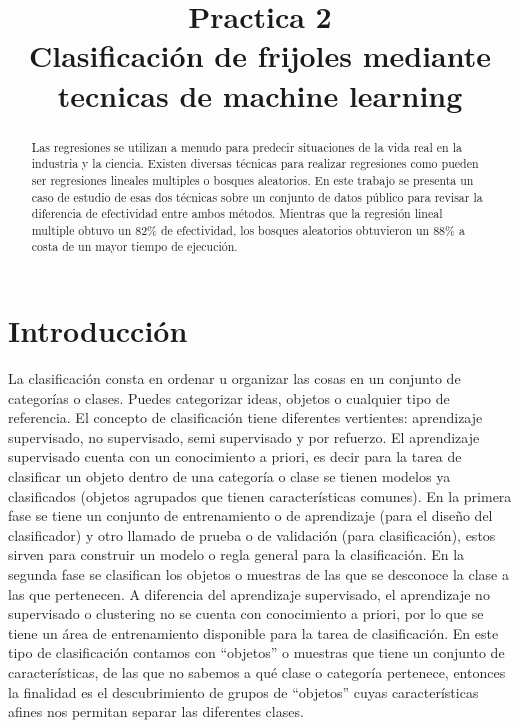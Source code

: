 \documentclass[conference]{IEEEtran}
\begin{document}
\title{Practica 2 \\ Clasificación de frijoles mediante tecnicas de machine learning}

\author{
}

\maketitle

\begin{abstract}
Las regresiones se utilizan a menudo para predecir situaciones de la vida real en la industria y la ciencia. Existen diversas técnicas para realizar regresiones como pueden ser regresiones lineales multiples o bosques aleatorios. En este trabajo se presenta un caso de estudio de esas dos técnicas sobre un conjunto de datos público para revisar la diferencia de efectividad entre ambos métodos. Mientras que la regresión lineal multiple obtuvo un 82\% de efectividad, los bosques aleatorios obtuvieron un 88\% a costa de un mayor tiempo de ejecución.  
\end{abstract}

\section{Introducción}

La clasificación consta en ordenar u organizar las cosas en un conjunto de categorías o clases. Puedes categorizar ideas, objetos o cualquier tipo de referencia. El concepto de clasificación tiene diferentes vertientes: aprendizaje supervisado, no supervisado, semi supervisado y por refuerzo. El aprendizaje supervisado cuenta con un conocimiento a priori, es decir para la tarea de clasificar un objeto dentro de una categoría o clase se tienen modelos ya clasificados (objetos agrupados que tienen características comunes). En la primera fase se tiene un conjunto de entrenamiento o de aprendizaje (para el diseño del clasificador) y otro llamado de prueba o de validación (para clasificación), estos sirven para construir un modelo o regla general para la clasificación. En la segunda fase se clasifican los objetos o muestras de las que se desconoce la clase a las que pertenecen. 
A diferencia del aprendizaje supervisado, el aprendizaje no supervisado o clustering no se cuenta con conocimiento a priori, por lo que se tiene un área de entrenamiento disponible para la tarea de clasificación. En este tipo de clasificación contamos con “objetos” o muestras que tiene un conjunto de características, de las que no sabemos a qué clase o categoría pertenece, entonces la finalidad es el descubrimiento de grupos de “objetos” cuyas características afines nos permitan separar las diferentes clases. \\
\end{document}

